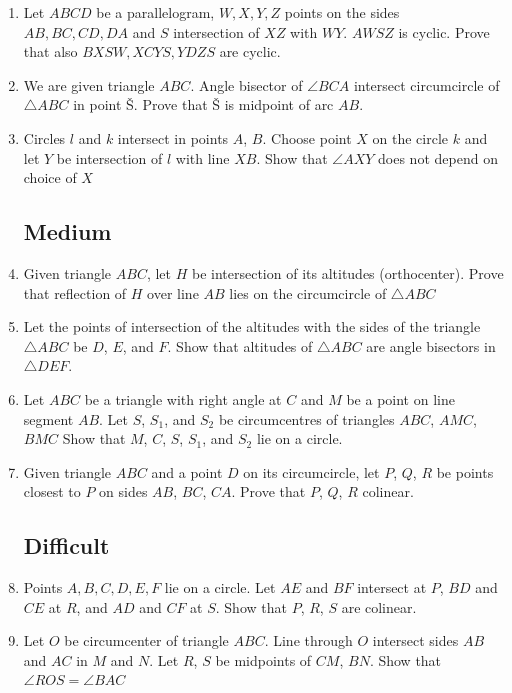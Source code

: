\documentclass[11pt,a5paper]{article}
\begin{document}
\begin{enumerate}
	\item{Let $ABCD$ be a parallelogram, $W, X, Y, Z$ points on the sides $AB, BC, CD, DA$ and $S$ intersection of $XZ$ with $WY$. $AWSZ$ is cyclic. Prove that also $BXSW, XCYS, YDZS$ are cyclic.}

	\item{We are given triangle $ABC$. Angle bisector of $\angle BCA$} intersect circumcircle of $\triangle ABC$ in point \v{S}. Prove that \v{S} is midpoint of arc $AB$.
	
	\item{Circles $l$ and $k$ intersect in points $A$, $B$. Choose point $X$ on the circle $k$ and let $Y$ be intersection of $l$ with line $XB$. Show that $\angle AXY$ does not depend on choice of $X$}

	\subsection*{Medium}
	
	\item{Given triangle $ABC$, let $H$ be intersection of its altitudes (orthocenter). Prove that reflection of $H$ over line $AB$ lies on the circumcircle of $\triangle ABC$}	
	
	\item{Let the points of intersection of the altitudes with the sides of the triangle $\triangle ABC$ be $D$, $E$, and $F$. Show that altitudes of $\triangle ABC$ are angle bisectors in $\triangle DEF$.}
	
	\item{Let $ABC$ be a triangle with right angle at $C$ and $M$ be a point on line segment $AB$. Let $S$, $S_1$, and $S_2$ be circumcentres of triangles $ABC$, $ AMC$, $BMC$ Show that $M$, $C$, $S$, $S_1$, and $S_2$ lie on a circle. }
		
	\item{Given triangle $ABC$ and a point $D$ on its circumcircle, let $P$, $Q$, $R$ be points closest to $P$ on sides $AB$, $BC$, $CA$. Prove that $P$, $Q$, $R$ colinear.}
	
	
	
	\subsection*{Difficult}
	
	\item{Points $A, B, C, D, E, F$ lie on a circle. Let $AE$ and $BF$ intersect at $P$, $BD$ and $CE$ at $R$, and $AD$ and $CF$ at $S$. Show that $P$, $R$, $S$ are colinear.}
	
	\item{Let $O$ be circumcenter of triangle $ABC$. Line through $O$ intersect sides $AB$ and $AC$ in $M$ and $N$. Let $R$, $S$ be midpoints of $CM$, $BN$. Show that $\angle ROS = \angle BAC$}

\end{enumerate}
\end{document}
